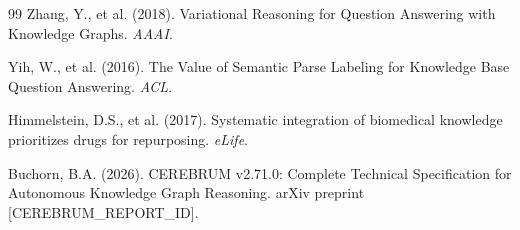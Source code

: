\documentclass[10pt,twocolumn]{article}
\begin{document}
\begin{thebibliography}{99}
Zhang, Y., et al. (2018).
Variational Reasoning for Question Answering with Knowledge Graphs.
\emph{AAAI}.

Yih, W., et al. (2016).
The Value of Semantic Parse Labeling for Knowledge Base Question Answering.
\emph{ACL}.

Himmelstein, D.S., et al. (2017).
Systematic integration of biomedical knowledge prioritizes drugs for repurposing.
\emph{eLife}.

Buchorn, B.A. (2026).
CEREBRUM v2.71.0: Complete Technical Specification for Autonomous Knowledge Graph Reasoning.
arXiv preprint [CEREBRUM\_REPORT\_ID].

\end{thebibliography}
\end{document}
